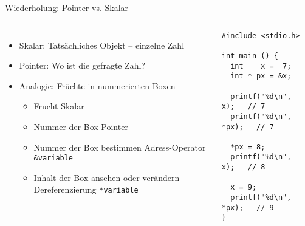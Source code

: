 \begin{frame}[fragile]{Wiederholung: Pointer vs. Skalar}
%
\begin{columns}[T]
%
\begin{itemize}
\item Skalar: Tatsächliches Objekt -- einzelne Zahl
\item Pointer: Wo ist die gefragte Zahl?
\item Analogie: Früchte in nummerierten Boxen
	\begin{itemize}
	\item Frucht         \tab \thus Skalar
	\item Nummer der Box \tab \thus Pointer 
	\item Nummer der Box bestimmen \newline
		\Thus Adress-Operator \texttt{\&variable}
	\item Inhalt der Box ansehen oder verändern \newline
		\Thus Dereferenzierung \texttt{*variable}
	\end{itemize}
\end{itemize}
%
\vspace{-10pt}
\begin{codebox}
\begin{verbatim}
#include <stdio.h>

int main () {
  int    x =  7;
  int * px = &x;
  
  printf("%d\n",   x);   // 7
  printf("%d\n", *px);   // 7
  
  *px = 8;
  printf("%d\n",   x);   // 8
  
  x = 9;
  printf("%d\n", *px);   // 9
}
\end{verbatim}
\end{codebox}
\end{columns}
%
\end{frame}


